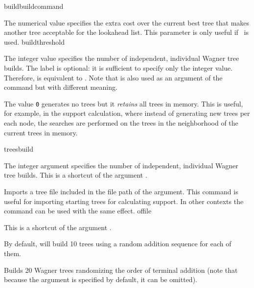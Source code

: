 \begin{command}{build}{buildcommand}
\begin{arguments}
            {The numerical value specifies the extra cost over the current best
            tree that makes another tree acceptable for the lookahead list. This 
            parameter is only useful if~ is used.}
            {buildthreshold}
            
            {The integer value specifies the number of independent, individual
            Wagner tree builds. The label  is optional: it is
            sufficient to specify only the integer value. Therefore,  is
            equivalent to .  Note that   is
            also used as an argument of the command 
            but with different meaning.
            
                        	The value \texttt{0} generates no trees but it \emph{retains} all trees in memory.
            This is useful, for example, in the  support calculation,
            where instead of generating new trees per each node, the searches are
            performed on the trees in the neighborhood of the current trees in memory.}
            {treesbuild}

            {The integer argument specifies the number of independent, individual
            Wagner tree builds. This is a shortcut of the argument .}
            {}

            {Imports a tree file included in the file path of the argument. This command is
            useful for importing starting trees for calculating  support.
            In other contexts the command  can be used with the same effect.}
            {offile}

            {This is a shortcut of the argument .}
            {}

   \end{arguments}
      
       {By default, \poy will build 10 trees using a random addition sequence for
       each of them.}

	\begin{poyexamples}
            {Builds 20 Wagner trees randomizing the order of terminal
            addition (note that because the argument  is specified by default, 
            it can be omitted).}


\end{poyexamples}
\end{command}

